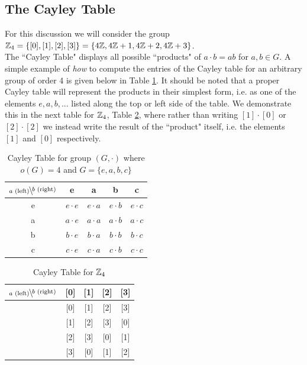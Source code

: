 \subsection{The Cayley Table}
For this discussion we will consider the group ${\mathbb{ Z}}_4=\{[0],[1],[2],[3]\}=\{4{\mathbb{ Z}},4{\mathbb{ Z}}+1,4{\mathbb{ Z}}+2,4{\mathbb{ Z}}+3\}$. \steezybreak\\
\noindent The ``Cayley Table" displays all possible ``products" of $a\cdot b=ab$ for $a,b\in G$. A simple example of \textit{how} to compute the entries of the Cayley table for an arbitrary group of order 4 is given below in Table \ref{tab:Cayley_dummy}. It should be noted that a proper Cayley table will represent the products in their simplest form, i.e. as one of the elements $e,a,b,...$ listed along the top or left side of the table. We demonstrate this in the next table for ${\mathbb{ Z}}_4$, Table \ref{tab:Cayley_Z4}, where rather than writing $[1]\cdot [0]$ or $[2]\cdot [2]$ we instead write the result of the ``product" itself, i.e. the elements $[1]$ and $[0]$ respectively.
\begin{table}[h!]
    \centering
    \begin{tabular}{c||c|c|c|c|}
         $\bsfrac{b\text{ (right)}}{a\text{ (left)}}$& e&a&b&c  \\ \hline \hline
         e&$e\cdot e$&$e\cdot a$&$e\cdot b$&$e\cdot c$  \\ \hline
         a&$a\cdot e$&$a\cdot a$&$a\cdot b$&$a\cdot c$  \\ \hline
         b&$b\cdot e$&$b\cdot a$&$b\cdot b$&$b\cdot c$  \\ \hline
         c&$c\cdot e$&$c\cdot a$&$c\cdot b$&$c\cdot c$ \\ \hline
    \end{tabular}
    \caption{Cayley Table for group $(G,\cdot)$ where $o(G)=4$ and $G=\{e,a,b,c\}$}
    \label{tab:Cayley_dummy}
\end{table}
\begin{table}[h!]
    \centering
    \begin{tabular}{c||c|c|c|c|}
         $\bsfrac{b\text{ (right)}}{a\text{ (left)}}$& [0]&[1]&[2]&[3]  \\ \hline \hline
         [0]&[0]&[1]&[2]&[3]  \\ \hline
         [1]&[1]&[2]&[3]&[0]  \\ \hline
         [2]&[2]&[3]&[0]&[1]  \\ \hline
         [3]&[3]&[0]&[1]&[2] \\ \hline
    \end{tabular}
    \caption{Cayley Table for ${\mathbb{ Z}}_4$}
    \label{tab:Cayley_Z4}
\end{table}

